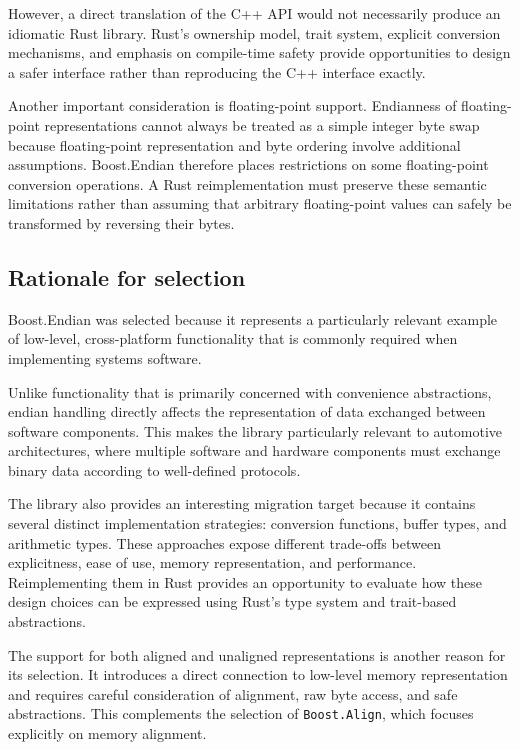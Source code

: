 However, a direct translation of the C++ API would not necessarily produce an idiomatic Rust library. 
Rust's ownership model, trait system, explicit conversion mechanisms, and emphasis on compile-time safety provide opportunities 
to design a safer interface rather than reproducing the C++ interface exactly.

Another important consideration is floating-point support. Endianness of floating-point representations cannot always be treated as 
a simple integer byte swap because floating-point representation and byte ordering involve additional assumptions. 
Boost.Endian therefore places restrictions on some floating-point conversion operations. A Rust reimplementation must 
preserve these semantic limitations rather than assuming that arbitrary floating-point values can safely be transformed by reversing their bytes.

\subsection{Rationale for selection}

Boost.Endian was selected because it represents a particularly relevant example of low-level, 
cross-platform functionality that is commonly required when implementing systems software.

Unlike functionality that is primarily concerned with convenience abstractions, 
endian handling directly affects the representation of data exchanged between software components. 
This makes the library particularly relevant to automotive architectures, where multiple software 
and hardware components must exchange binary data according to well-defined protocols.

The library also provides an interesting migration target because it contains several distinct implementation strategies: 
conversion functions, buffer types, and arithmetic types. These approaches expose different trade-offs between explicitness, 
ease of use, memory representation, and performance. 
Reimplementing them in Rust provides an opportunity to evaluate how these design choices can be expressed using Rust's type system 
and trait-based abstractions.

The support for both aligned and unaligned representations is another reason for its selection. 
It introduces a direct connection to low-level memory representation and requires careful consideration of alignment, 
raw byte access, and safe abstractions. This complements the selection of \texttt{Boost.Align}, which focuses explicitly on memory alignment.

